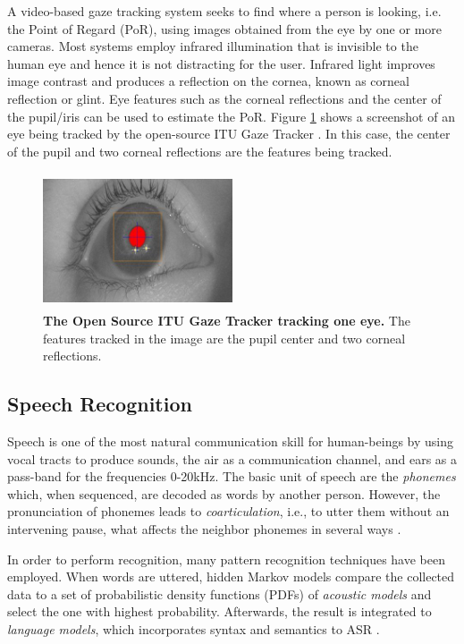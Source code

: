 \documentclass[]{article}
\begin{document}
A video-based gaze tracking system seeks to find where a person is looking, i.e.
the Point of Regard (PoR), using images obtained from the eye by one
or more cameras. Most systems employ infrared
illumination that is invisible to the human eye and hence it is not distracting
for the user. Infrared light improves image contrast and produces a reflection
on the cornea, known as corneal reflection or glint. Eye features such as the
corneal reflections and the center of the pupil/iris can be used to estimate the
PoR. Figure \ref{screenGazeTracker} shows a screenshot of an eye being tracked
by the open-source ITU Gaze Tracker \cite{lowcostitugazetracker,Rozado2012}. In this case,
the center of the pupil and two corneal reflections are the features being
tracked.


\begin{figure}[ht]
\begin{center}
\includegraphics[width=0.5\textwidth, height=40mm]{figures/screenGazeTracker.jpg}
\vspace{-3mm}
\end{center}
\caption{\textbf{The Open Source ITU Gaze Tracker tracking one eye.} The
features tracked in the image are the pupil center and two corneal reflections.}
\label{screenGazeTracker}
\end{figure}


\subsection{Speech Recognition}
Speech is one of the most natural communication skill for human-beings by using vocal tracts to produce sounds, the air as a communication channel,
and ears as a pass-band for the frequencies 0-20kHz. The basic unit of speech are the \textit{phonemes} which, when sequenced, are decoded as words
by another person. However, the pronunciation of phonemes leads to \textit{coarticulation}, i.e., to utter them without an intervening pause, what
affects the neighbor phonemes in several ways \cite{Douglas2008}.


In order to perform recognition, many pattern recognition techniques have been employed. When words are uttered, hidden Markov models compare the
collected data to a set of probabilistic density functions (PDFs) of \textit{acoustic models} and select the one with highest probability. Afterwards,
the result is integrated to \textit{language models}, which incorporates syntax and semantics to ASR \cite{Douglas2008}.
\end{document}
